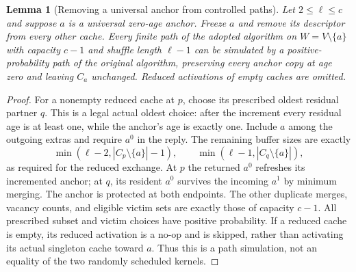 \documentclass[11pt]{article}
\newtheorem{lemma}[theorem]{Lemma}
\begin{document}
\begin{lemma}[Removing a universal anchor from controlled paths]
\label{lem:anchorreduction}
Let $2\le\ell\le c$ and suppose $a$ is a universal
zero-age anchor. Freeze $a$ and remove its descriptor from
every other cache. Every finite path of the adopted algorithm
on $W=V\setminus\{a\}$ with capacity $c-1$ and shuffle
length $\ell-1$ can be simulated by a positive-probability
path of the original algorithm, preserving every anchor
copy at age zero and leaving $C_a$ unchanged. Reduced
activations of empty caches are omitted.
\end{lemma}
\begin{proof}
For a nonempty reduced cache at $p$, choose its prescribed
oldest residual partner $q$. This is a legal actual oldest
choice: after the increment every residual age is at least
one, while the anchor's age is exactly one.
Include $a$ among the outgoing extras and require $a^0$
in the reply. The remaining buffer sizes are exactly
\[
 \min(\ell-2,|C_p\setminus\{a\}|-1),\qquad
 \min(\ell-1,|C_q\setminus\{a\}|),
\]
as required for the reduced exchange. At $p$ the returned
$a^0$ refreshes its incremented anchor; at $q$, its resident
$a^0$ survives the incoming $a^1$ by minimum merging.
The anchor is protected at both endpoints. The other
duplicate merges, vacancy counts, and eligible victim sets
are exactly those of capacity $c-1$. All prescribed subset
and victim choices have positive probability.
If a reduced cache is empty, its reduced activation is a
no-op and is skipped, rather than activating its actual
singleton cache toward $a$. Thus this is a path simulation,
not an equality of the two randomly scheduled kernels.
\end{proof}
\end{document}

